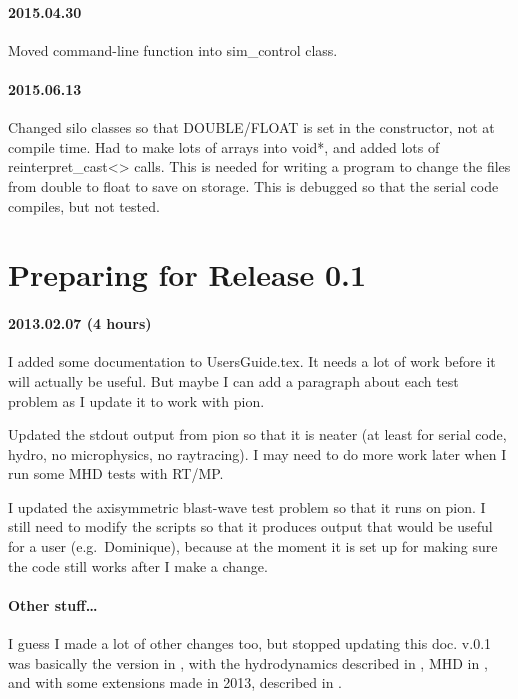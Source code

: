 \documentclass[a4paper,11pt]{article}
\begin{document}
\paragraph{2015.04.30}
Moved command-line function into sim\_control class.

\paragraph{2015.06.13}
Changed silo classes so that DOUBLE/FLOAT is set in the constructor, not at compile time.
Had to make lots of arrays into void*, and added lots of reinterpret\_cast<> calls.
This is needed for writing a program to change the files from double to float to save on storage.
This is debugged so that the serial code compiles, but not tested.

\section{Preparing for Release 0.1}
\paragraph{2013.02.07 (4 hours)}
I added some documentation to UsersGuide.tex.
It needs a lot of work before it will actually be useful.
But maybe I can add a paragraph about each test problem as I update it to work with pion.

Updated the stdout output from pion so that it is neater (at least for serial code, hydro, no microphysics, no raytracing).  I may need to do more work later when I run some MHD tests with RT/MP.

I updated the axisymmetric blast-wave test problem so that it runs on pion.
I still need to modify the scripts so that it produces output that would be useful for a user (e.g.\ Dominique), because at the moment it is set up for making sure the code still works after I make a change.

\paragraph{Other stuff\ldots}
I guess I made a lot of other changes too, but stopped updating this doc.
\pion{} v.0.1 was basically the version in \citet{Mac12}, with the hydrodynamics described in \citet{MacLim10}, MHD in \citet{MacLim11}, and with some extensions made in 2013, described in \citet{MacLanGva13}.





\end{document}
